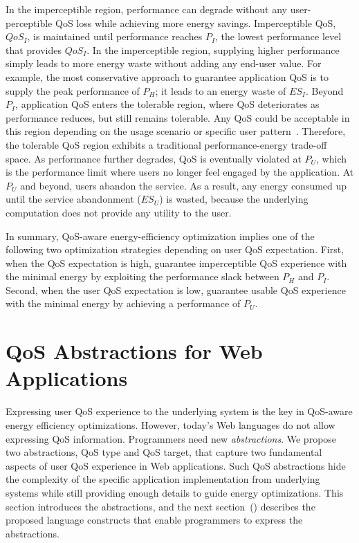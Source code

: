 In the imperceptible region, performance can degrade without any user-perceptible QoS loss while achieving more energy savings. Imperceptible QoS, $QoS_I$, is maintained until performance reaches $P_I$, the lowest performance level that provides $QoS_I$. In the imperceptible region, supplying higher performance simply leads to more energy waste without adding any end-user value. For example, the most conservative approach to guarantee application QoS is to supply the peak performance of $P_H$; it leads to an energy waste of $ES_I$. Beyond $P_I$, application QoS enters the tolerable region, where QoS deteriorates as performance reduces, but still remains tolerable. Any QoS could be acceptable in this region depending on the usage scenario or specific user pattern~\cite{usagepattern,satscore}. Therefore, the tolerable QoS region exhibits a traditional performance-energy trade-off space. As performance further degrades, QoS is eventually violated at $P_U$, which is the performance limit where users no longer feel engaged by the application. At $P_U$ and beyond, users abandon the service. As a result, any energy consumed up until the service abandonment ($ES_U$) is wasted, because the underlying computation does not provide any utility to the user.

In summary, QoS-aware energy-efficiency optimization implies one of the following two optimization strategies depending on user QoS expectation. First, when the QoS expectation is high, guarantee imperceptible QoS experience with the minimal energy by exploiting the performance slack between $P_H$ and $P_I$. Second, when the user QoS expectation is low, guarantee usable QoS experience with the minimal energy by achieving a performance of $P_U$.

\section{QoS Abstractions for Web Applications}
\label{sec:lang:abst}

Expressing user QoS experience to the underlying system is the key in QoS-aware energy efficiency optimizations. However, today's Web languages do not allow expressing QoS information. Programmers need new \textit{abstractions}. We propose two abstractions, QoS type and QoS target, that capture two fundamental aspects of user QoS experience in Web applications. Such QoS abstractions hide the complexity of the specific application implementation from underlying systems while still providing enough details to guide energy optimizations. This section introduces the abstractions, and the next section~() describes the proposed language constructs that enable programmers to express the abstractions.

